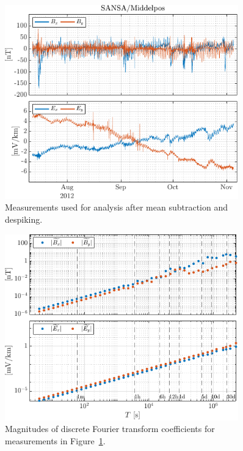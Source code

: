 \documentclass[draft,linenumbers]{agujournal2018}
\begin{document}
\begin{figure}[t]
  \centering
  \includegraphics[width=0.9\textwidth]{figures/tsplot-original-Middelpos-tf1.pdf}
  \caption{Measurements used for analysis after mean subtraction and despiking.}
  \label{fig:timeseries}
\end{figure}

\begin{figure}[b]
  \centering
  \includegraphics[width=0.9\textwidth]{figures/dftplot-original-averaged-magnitudes-Middelpos-tf1.pdf}
  \caption{Magnitudes of discrete Fourier transform coefficients for measurements in Figure~\ref{fig:timeseries}.}
  \label{fig:dft}
\end{figure}

\clearpage
\end{document}
